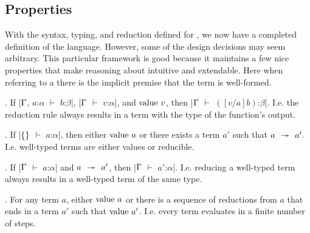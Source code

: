 \subsection{Properties}
With the syntax, typing, and reduction defined for \LangA,
we now have a completed definition of the language.
However, some of the design decisions may seem arbitrary.
This particular framework is good because it maintains a few nice properties that make reasoning about \LangA intuitive and extendable.
Here when referring to a  there is the implicit premise that the term is well-formed.

\begin{theorem}
  .
  If
    \code|$\Gamma$, $a$:$α$ $⊢$ $b$:$β$|,
    \code|$\Gamma$ $⊢$ $v$:$α$|, and
    $\mathrm{value}~v$,
  then
    \code|$\Gamma$ $⊢$ $([v/a]b)$:$β$|.
  I.e. the  reduction rule always results in a term with the type of the function's output.
\end{theorem}

\begin{theorem}
  .
  If
    \code|$\left\{  \right\}$ $⊢$ $a$:$α$|,
  then
    either $\mathrm{value}~a$ or
    there exists a term $a'$ such that $a \hspace{0.4em}\twoheadrightarrow\hspace{0.4em} a'$.
  I.e. well-typed terms are either values or reducible.
\end{theorem}

\begin{theorem}
  .
  If
    \code|$\Gamma$ $⊢$ $a$:$α$| and $a \hspace{0.4em}\twoheadrightarrow\hspace{0.4em} a'$,
  then
    \code|$\Gamma$ $⊢$ $a'$:$α$|.
  I.e. reducing a well-typed term always results in a well-typed term of the same type.
\end{theorem}

%
%
%

\begin{theorem}
  .
  For any term $a$,
  either
    $\mathrm{value}~a$
  or
    there is a sequence of reductions from $a$ that ends in a term $a'$ such that $\mathrm{value}~a'$.
  I.e. every term evaluates in a finite number of steps.
\end{theorem}
